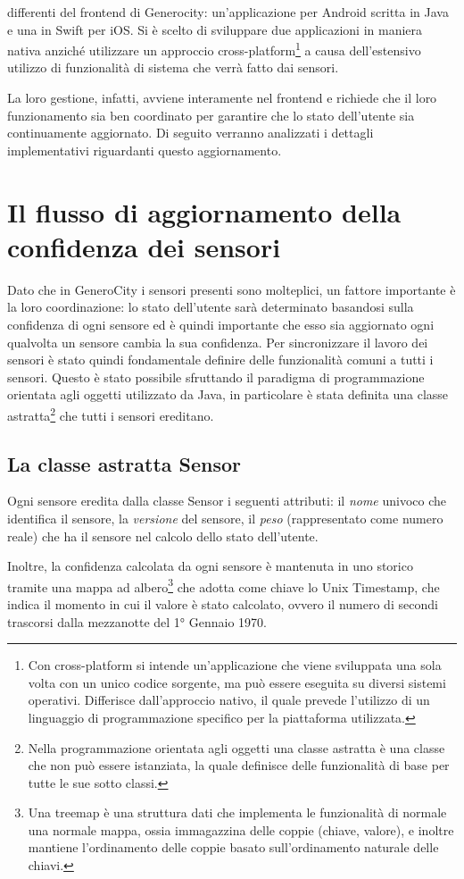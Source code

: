 differenti del frontend di Generocity: un'applicazione per Android scritta in Java e una in Swift per iOS. Si è scelto di sviluppare due applicazioni in maniera nativa anziché utilizzare un approccio cross-platform\footnote{Con cross-platform si intende un'applicazione che viene sviluppata una sola volta con un unico codice sorgente, ma può essere eseguita su diversi sistemi operativi. Differisce dall'approccio nativo, il quale prevede l'utilizzo di un linguaggio di programmazione specifico per la piattaforma utilizzata.} a causa dell'estensivo utilizzo di funzionalità di sistema che verrà fatto dai sensori.

La loro gestione, infatti,  avviene interamente nel frontend e richiede che il loro funzionamento sia ben coordinato per garantire che lo stato dell'utente sia continuamente aggiornato. Di seguito verranno analizzati i dettagli implementativi riguardanti questo aggiornamento.


\section{Il flusso di aggiornamento della confidenza dei sensori}
Dato che in GeneroCity i sensori presenti sono molteplici, un fattore importante è la loro coordinazione: lo stato dell'utente sarà determinato basandosi sulla confidenza di ogni sensore ed è quindi importante che esso sia aggiornato ogni qualvolta un sensore cambia la sua confidenza. Per sincronizzare il lavoro dei sensori è stato quindi fondamentale definire delle funzionalità comuni a tutti i sensori. Questo è stato possibile sfruttando il paradigma di programmazione orientata agli oggetti utilizzato da Java, in particolare è stata definita una classe astratta\footnote{Nella programmazione orientata agli oggetti una classe astratta è una classe che non può essere istanziata, la quale definisce delle funzionalità di base per tutte le sue sotto classi.} che tutti i sensori ereditano.

\subsection{La classe astratta Sensor}\label{ref:sensor}
Ogni sensore eredita dalla classe Sensor i seguenti attributi: il \textit{nome} univoco che identifica il sensore, la \textit{versione} del sensore, il \textit{peso} (rappresentato come numero reale) che ha il sensore nel calcolo dello stato dell'utente.

Inoltre, la confidenza calcolata da ogni sensore è mantenuta in uno storico tramite una mappa ad albero\footnote{Una treemap è una struttura dati che implementa le funzionalità di normale una normale mappa, ossia immagazzina delle coppie (chiave, valore), e inoltre mantiene l'ordinamento delle coppie basato sull'ordinamento naturale delle chiavi.} che adotta come chiave lo Unix Timestamp, che indica il momento in cui il valore è stato calcolato, ovvero il numero di secondi trascorsi dalla mezzanotte del 1° Gennaio 1970.

